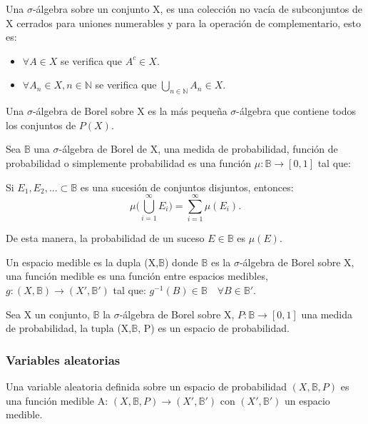 \documentclass[../proyecto.tex]{memoir}
\begin{document}

Una $\sigma$-álgebra sobre un conjunto X, es una colección no vacía de subconjuntos de X cerrados para uniones numerables y para la operación de complementario, esto es:
\begin{itemize}
\item $\forall A \in X$ se verifica que $A^{c} \in X$.
\item $ \forall A_{n} \in X, n \in \mathds{N} $ se verifica que $\bigcup _{n \in \mathds{N}} A_{n} \in X$.
\end{itemize}
 
Una $\sigma$-álgebra de Borel sobre X es la más pequeña $\sigma$-álgebra que contiene todos los conjuntos de $P(X)$. 
 
Sea $\mathds{B}$ una $\sigma$-álgebra de Borel de X, una medida de probabilidad, función de probabilidad o simplemente probabilidad es una función $\mu: \mathds{B} \rightarrow [0,1] $ tal que: 

Si $E_{1}, E_{2},... \subset \mathds{B}$ es una sucesión de conjuntos disjuntos, entonces:
\begin{equation*}
 \mu \big( \bigcup _{i=1} ^{\infty} E_{i} \big) = \sum _{i=1}^{\infty} \mu ( E_{i} ).
\end{equation*}

De esta manera, la probabilidad de un suceso $E \in \mathds{B}$ es $\mu(E)$.

Un espacio medible es la dupla (X,$\mathds{B}$) donde $\mathds{B}$ es la $\sigma$-álgebra de Borel sobre X, una función medible es una función entre espacios medibles, $g:  (X,\mathds{B}) \rightarrow (X',\mathds{B}')$ tal que: $g^{-1}(B) \in \mathds{B} \quad \forall B \in \mathds{B}'$.

Sea X un conjunto, $\mathds{B}$ la $\sigma$-álgebra de Borel sobre X, $P: \mathds{B} \rightarrow [0,1] $ una medida de probabilidad, la tupla (X,$\mathds{B}$, P) es un espacio de probabilidad. 

\subsubsection{Variables aleatorias}


Una variable aleatoria definida sobre un espacio de probabilidad $(X, \mathds{B}, P)$ es una función medible A: $(X, \mathds{B}, P) \rightarrow  (X', \mathds{B}')$ con $(X', \mathds{B}')$ un espacio medible.
\end{document}

